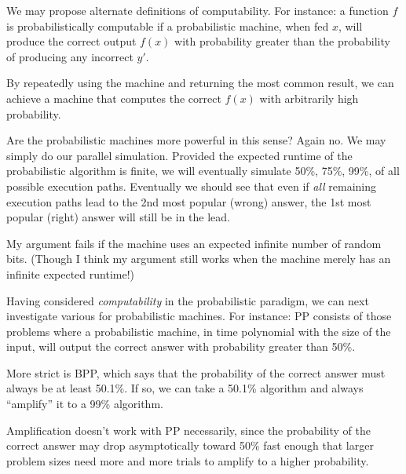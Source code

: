 \begin{remark}
  We may propose alternate definitions of computability. For instance: a
  function $f$ is probabilistically computable if a probabilistic
  machine, when fed $x$, will produce the correct output $f(x)$ with
  probability greater than the probability of producing any incorrect
  $y'$.

  By repeatedly using the machine and returning the most common result,
  we can achieve a machine that computes the correct $f(x)$ with
  arbitrarily high probability.

  Are the probabilistic machines more powerful in this sense? Again no.
  We may simply do our parallel simulation. Provided the expected
  runtime of the probabilistic algorithm is finite, we will eventually
  simulate 50\%, 75\%, 99\%, of all possible execution paths. Eventually
  we should see that even if \emph{all} remaining execution paths lead
  to the 2nd most popular (wrong) answer, the 1st most popular (right)
  answer will still be in the lead.

  My argument fails if the machine uses an expected infinite number of
  random bits. (Though I think my argument still works when the machine
  merely has an infinite expected runtime!)
\end{remark}


\begin{remark}
  Having considered \emph{computability} in the probabilistic paradigm,
  we can next investigate various  for
  probabilistic machines. For instance: PP consists of those problems
  where a probabilistic machine, in time polynomial with the size of the
  input, will output the correct answer with probability greater than
  50\%.

  More strict is BPP, which says that the probability of the correct
  answer must always be at least 50.1\%. If so, we can take a 50.1\%
  algorithm and always ``amplify'' it to a 99\% algorithm.

  Amplification doesn't work with PP necessarily, since the probability
  of the correct answer may drop asymptotically toward 50\% fast enough
  that larger problem sizes need more and more trials to amplify to a
  higher probability.
\end{remark}

